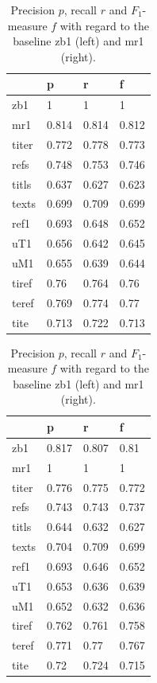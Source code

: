 \begin{table}
\begin{tabular}{llll}
  \toprule
  {} &      p &      r &      f \\
  \midrule
  zb1   &      1 &      1 &      1 \\
  mr1   &  0.814 &  0.814 &  0.812 \\
  titer &  0.772 &  0.778 &  0.773 \\
  refs  &  0.748 &  0.753 &  0.746 \\
  titls &  0.637 &  0.627 &  0.623 \\
  texts &  0.699 &  0.709 &  0.699 \\
  ref1  &  0.693 &  0.648 &  0.652 \\
  uT1   &  0.656 &  0.642 &  0.645 \\
  uM1   &  0.655 &  0.639 &  0.644 \\
  tiref &   0.76 &  0.764 &   0.76 \\
  teref &  0.769 &  0.774 &   0.77 \\
  tite  &  0.713 &  0.722 &  0.713 \\
  \bottomrule
\end{tabular}
\begin{tabular}{llll}
  \toprule
  {} &      p &      r &      f \\
  \midrule
  zb1   &  0.817 &  0.807 &   0.81 \\
  mr1   &      1 &      1 &      1 \\
  titer &  0.776 &  0.775 &  0.772 \\
  refs  &  0.743 &  0.743 &  0.737 \\
  titls &  0.644 &  0.632 &  0.627 \\
  texts &  0.704 &  0.709 &  0.699 \\
  ref1  &  0.693 &  0.646 &  0.652 \\
  uT1   &  0.653 &  0.636 &  0.639 \\
  uM1   &  0.652 &  0.632 &  0.636 \\
  tiref &  0.762 &  0.761 &  0.758 \\
  teref &  0.771 &   0.77 &  0.767 \\
  tite  &   0.72 &  0.724 &  0.715 \\
  \bottomrule
\end{tabular}
\caption{Precision $p$, recall $r$ and $F_1$-measure $f$ with regard to the baseline zb1 (left) and mr1 (right).}
\end{table}


